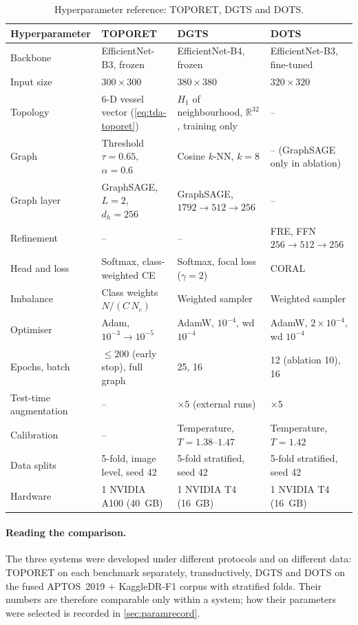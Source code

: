 \begin{table}[!htbp]
\centering
\caption[Hyperparameter reference]{Hyperparameter reference: TOPORET, DGTS and DOTS.}
\label{tab:hyper}
\small
\begin{tabular}{@{}P{3.4cm}P{3.6cm}P{3.6cm}P{3.6cm}@{}}
\toprule
Hyperparameter & TOPORET~\cite{belhadj2025plos} & DGTS~\cite{belhadj2026dgts} & DOTS~\cite{belhadj2026dots} \\
\midrule
Backbone & EfficientNet-B3, frozen & EfficientNet-B4, frozen & EfficientNet-B3, fine-tuned \\
Input size & $300\times300$ & $380\times380$ & $320\times320$ \\
Topology & 6-D vessel vector (\cref{eq:tda-toporet}) & $H_1$ of neighbourhood, $\mathbb{R}^{32}$, training only & -- \\
Graph & Threshold $\tau=0.65$, $\alpha=0.6$ & Cosine $k$-NN, $k=8$ & -- (GraphSAGE only in ablation) \\
Graph layer & GraphSAGE, $L=2$, $d_h=256$ & GraphSAGE, $1792\to512\to256$ & -- \\
Refinement & -- & -- & FRE, FFN $256\to512\to256$ \\
Head and loss & Softmax, class-weighted CE & Softmax, focal loss ($\gamma=2$) & CORAL \\
Imbalance & Class weights $N/(C\,N_c)$ & Weighted sampler & Weighted sampler \\
Optimiser & Adam, $10^{-3}\to10^{-5}$ & AdamW, $10^{-4}$, wd $10^{-4}$ & AdamW, $2\times10^{-4}$, wd $10^{-4}$ \\
Epochs, batch & $\leq200$ (early stop), full graph & 25, 16 & 12 (ablation 10), 16 \\
Test-time augmentation & -- & $\times5$ (external runs) & $\times5$ \\
Calibration & -- & Temperature, $T=1.38$--$1.47$ & Temperature, $T=1.42$ \\
Data splits & 5-fold, image level, seed 42 & 5-fold stratified, seed 42 & 5-fold stratified, seed 42 \\
Hardware & 1 NVIDIA A100 (40~GB) & 1 NVIDIA T4 (16~GB) & 1 NVIDIA T4 (16~GB) \\
\bottomrule
\end{tabular}
\end{table}

\paragraph{Reading the comparison.}
The three systems were developed under different protocols and on different data:
TOPORET on each benchmark separately, transductively, DGTS and DOTS on the fused
APTOS~2019 $+$ KaggleDR-F1 corpus with stratified folds. Their numbers are therefore
comparable only within a system; how their parameters were selected is recorded in
\cref{sec:paramrecord}.

